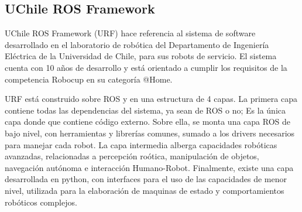 
%
%
%
%
%







\subsection{UChile ROS Framework}

UChile ROS Framework (URF) hace referencia al sistema de software desarrollado en el laboratorio de rob\'otica del Departamento de Ingenier\'ia El\'ectrica de la Universidad de Chile, para sus robots de servicio. El sistema cuenta con 10 a\~nos de desarrollo y est\'a orientado a cumplir los requisitos de la competencia Robocup en su categor\'ia @Home.

URF est\'a construido sobre ROS y en una estructura de 4 capas. La primera capa contiene todas las dependencias del sistema, ya sean de ROS o no; Es la \'unica capa donde que contiene c\'odigo externo. Sobre ella, se monta una capa ROS de bajo nivel, con herramientas y librer\'ias comunes, sumado a los drivers necesarios para manejar cada robot. La capa intermedia alberga capacidades rob\'oticas avanzadas, relacionadas a percepci\'on ro\'otica, manipulaci\'on de objetos, navegaci\'on aut\'onoma e interacci\'on Humano-Robot. Finalmente, existe una capa desarrollada en python, con interfaces para el uso de las capacidades de menor nivel, utilizada para la elaboraci\'on de maquinas de estado y comportamientos rob\'oticos complejos.

